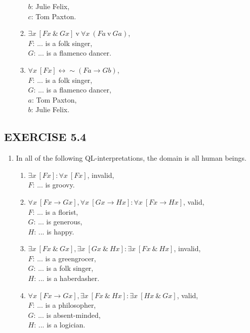 \documentclass[a4paper,12pt]{article}
\newcommand{\ra}{\rightarrow}
\newcommand{\lra}{\leftrightarrow}
\newcommand{\s}{\sim}
\newcommand{\tv}{ \ \textrm{v} \ }
\newcommand{\ta}{ \ \& \ }
\newcommand{\all}{\forall}
\newcommand{\ex}{\exists}
\begin{document}
\begin{enumerate}[label=\arabic*,leftmargin=*]
\begin{enumerate}[label=(\roman*),leftmargin=*]
                    $b$: Julie Felix,\\
                    $c$: Tom Paxton.
                \item $\ex x \ [Fx \ta Gx] \tv \all x \ (Fa \tv Ga)$,\\
                    $F$: ... is a folk singer,\\
                    $G$: ... is a flamenco dancer.
                \item $\all x \ [Fx] \lra \s (Fa \ra Gb)$,\\
                    $F$: ... is a folk singer,\\
                    $G$: ... is a flamenco dancer,\\
                    $a$: Tom Paxton,\\
                    $b$: Julie Felix.
            \end{enumerate}

    \end{enumerate}

    \subsection*{EXERCISE 5.4}

    \begin{enumerate}[label=\arabic*,leftmargin=*]
        \item In all of the following QL-interpretations, the domain is all human beings.
            \begin{enumerate}[label=(\roman*),leftmargin=*]
                \item $\ex x \ [Fx] : \all x \ [Fx]$, invalid,\\
                    $F$: ... is groovy.
                \item $\all x \ [Fx \ra Gx], \all x \ [Gx \ra Hx] : \all x \ [Fx \ra Hx]$, valid,\\
                    $F$: ... is a florist,\\
                    $G$: ... is generous,\\
                    $H$: ... is happy.
                \item $\ex x \ [Fx \ta Gx], \ex x \ [Gx \ta Hx] : \ex x \ [Fx \ta Hx]$, invalid,\\
                    $F$: ... is a greengrocer,\\
                    $G$: ... is a folk singer,\\
                    $H$: ... is a haberdasher.
                \item $\all x \ [Fx \ra Gx], \ex x \ [Fx \ta Hx] : \ex x \ [Hx \ta Gx]$, valid,\\
                    $F$: ... is a philosopher,\\
                    $G$: ... is absent-minded,\\
                    $H$: ... is a logician.
            \end{enumerate}

    \end{enumerate}
\end{document}
